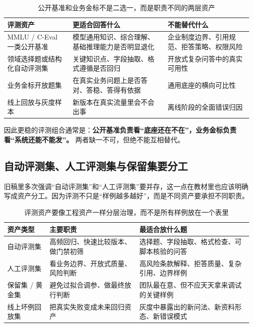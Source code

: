\begin{table}[H]
\centering
\small
\begin{tabularx}{\textwidth}{>{\raggedright\arraybackslash}p{2.6cm}>{\raggedright\arraybackslash}p{3.2cm}>{\raggedright\arraybackslash}X}
\toprule
\textbf{评测资产} & \textbf{更适合回答什么} & \textbf{不能替代什么} \\
\midrule
MMLU / C-Eval 一类公开基准 & 模型通用知识、综合理解、基础推理能力是否明显退化 & 企业制度边界、引用规范、拒答策略、权限风险 \\
领域选择题或结构化自动评测集 & 关键知识点、字段抽取、格式遵循是否回归 & 开放式复杂问答中的真实可用性 \\
业务金标开放题集 & 在真实业务问题上是否答对、答稳、答得有依据 & 通用底座的横向可比性 \\
线上回放与灰度样本 & 新版本在真实流量里会不会出事 & 离线阶段的全面错误归因 \\
\bottomrule
\end{tabularx}
\caption{公开基准和业务金标不是二选一，而是职责不同的两层资产}
\label{tab:public-benchmark-vs-business-gold}
\end{table}

因此更稳的评测组合通常是：\textbf{公开基准负责看“底座还在不在”，业务金标负责看“系统还能不能发”。} 两者缺一不可，但绝不能互相替代。

\subsection{自动评测集、人工评测集与保留集要分工}
旧稿里多次强调“自动评测集”和“人工评测集”要并存，这一点在教材里也应该明确写成资产分工。因为评测不只是“样例越多越好”，而是不同资产要承担不同职责。

\begin{table}[H]
\centering
\small
\begin{tabularx}{\textwidth}{>{\raggedright\arraybackslash}p{2.8cm}>{\raggedright\arraybackslash}p{3cm}>{\raggedright\arraybackslash}X}
\toprule
\textbf{资产类型} & \textbf{主要职责} & \textbf{最适合放什么题} \\
\midrule
自动评测集 & 高频回归、快速比较版本、做门禁初筛 & 选择题、字段抽取、格式检查、可脚本核验的问答 \\
人工评测集 & 看业务边界、开放式质量、风险判断 & 高风险条款解释、拒答质量、复杂引用、边界样例 \\
保留集 / 黄金集 & 避免过拟合调参、做最终放行判断 & 团队最在意、但不应天天拿来调试的关键样例 \\
线上坏例回放集 & 把真实失败变成未来回归资产 & 灰度中暴露出的新问法、新资料形态、新错误模式 \\
\bottomrule
\end{tabularx}
\caption{评测资产要像工程资产一样分层治理，而不是所有样例放在一个表里}
\label{tab:eval-asset-roles}
\end{table}


